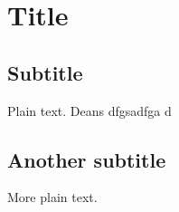 \documentclass{article}
\begin{document}
\section{Title}

\subsection{Subtitle}

Plain text. Deans dfgsadfga d

\subsection{Another subtitle}

More plain text.
\end{document}
